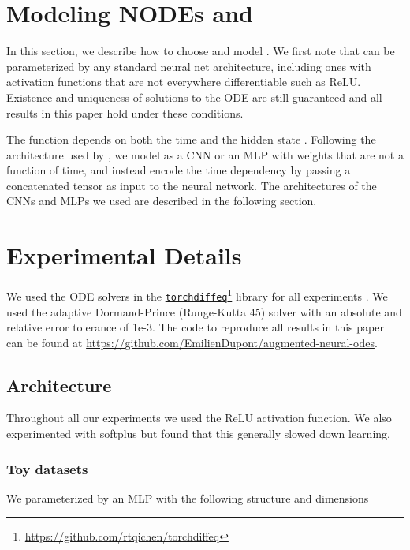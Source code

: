 \documentclass{article}
\begin{document}
\section{Modeling NODEs and }

In this section, we describe how to choose and model . We first note that  can be parameterized by any standard neural net architecture, including ones with activation functions that are not everywhere differentiable such as ReLU. Existence and uniqueness of solutions to the ODE are still guaranteed and all results in this paper hold under these conditions.

The function  depends on both the time  and the hidden state . Following the architecture used by \cite{chen2018neural}, we model  as a CNN or an MLP with weights that are not a function of time, and instead encode the time dependency by passing a concatenated tensor  as input to the neural network. The architectures of the CNNs and MLPs we used are described in the following section.

\section{Experimental Details}

We used the ODE solvers in the \href{https://github.com/rtqichen/torchdiffeq}{\texttt{torchdiffeq}}\footnote{\href{https://github.com/rtqichen/torchdiffeq}{https://github.com/rtqichen/torchdiffeq}} library for all experiments \citep{chen2018neural}. We used the adaptive Dormand-Prince (Runge-Kutta 45) solver with an absolute and relative error tolerance of 1e-3. The code to reproduce all results in this paper can be found at \url{https://github.com/EmilienDupont/augmented-neural-odes}.

\subsection{Architecture}

Throughout all our experiments we used the ReLU activation function. We also experimented with softplus but found that this generally slowed down learning.

\subsubsection{Toy datasets}

We parameterized  by an MLP with the following structure and dimensions
\end{document}
